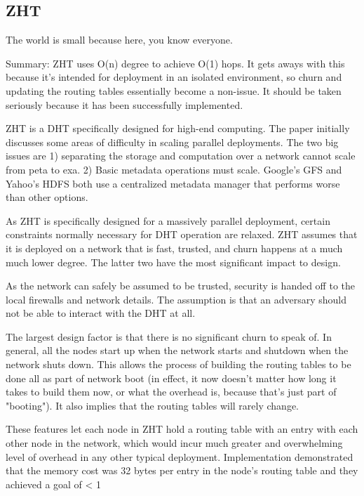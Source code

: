 \documentclass[10pt,letterpaper]{report}
\begin{document}
\subsection{ZHT}
The world is small because here, you know everyone.

Summary: ZHT\cite{li2013zht} uses O(n) degree to achieve O(1) hops.   It gets aways with this because it's intended for deployment in an isolated environment, so churn and updating the routing tables essentially  become a non-issue. It should be taken seriously because it has been successfully implemented.

ZHT is a DHT specifically designed for high-end computing.  The paper initially discusses  some areas of difficulty in scaling parallel deployments.  The two big issues are 1)  separating the storage and computation over a network cannot scale from peta to exa.  2) Basic metadata operations must scale.  Google's GFS and Yahoo's HDFS both use a centralized metadata manager that performs worse than other options.

As ZHT is specifically designed for a massively parallel deployment, certain constraints normally necessary for DHT operation are relaxed.  ZHT assumes that it is deployed on a network that is fast, trusted, and churn happens at a much much lower degree.  The latter two have the most significant impact to design.

 As the network can safely be assumed to be trusted, security is handed off to the local firewalls and network details.   The assumption is that an adversary should not be able to interact with the DHT at all.  

The largest design factor is that there is no significant churn to speak of.  In general, all the nodes start up when the network starts and shutdown when the network shuts down.  This  allows the process of building the routing tables to be done all as part of network boot (in effect, it now doesn't matter how long it takes to build them now, or what the overhead is, because that's just part of "booting").  It also implies that the routing tables will rarely change.  

These features let each node in ZHT hold a routing table with an entry with each other node in the network, which would incur much greater and overwhelming level of overhead in any  other typical deployment.  Implementation demonstrated that the memory cost was 32 bytes per entry in the node's routing table and they achieved a goal of < 1%
\end{document}
